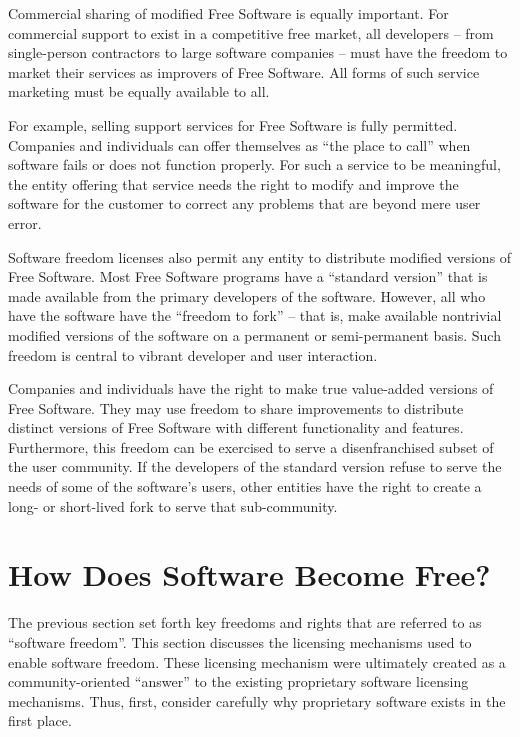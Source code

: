 Commercial sharing of modified Free Software is equally important.
For commercial support to exist in a competitive free market, all
developers -- from single-person contractors to large software
companies -- must have the freedom to market their services as
improvers of Free Software.  All forms of such service marketing must
be equally available to all.

For example, selling support services for Free Software is fully
permitted. Companies and individuals can offer themselves as ``the place
to call'' when software fails or does not function properly.  For such a
service to be meaningful, the entity offering that service needs the
right to modify and improve the software for the customer to correct any
problems that are beyond mere user error.

Software freedom licenses also permit any entity to distribute modified
versions of Free Software.  Most Free Software programs have a ``standard
version'' that is made available from the primary developers of the software.
However, all who have the software have the ``freedom to fork'' -- that is,
make available nontrivial modified versions of the software on a permanent or
semi-permanent basis.  Such freedom is central to vibrant developer and user
interaction.

Companies and individuals have the right to make true value-added versions
of Free Software.  They may use freedom to share improvements to
distribute distinct versions of Free Software with different functionality
and features.  Furthermore, this freedom can be exercised to serve a
disenfranchised subset of the user community.  If the developers of the
standard version refuse to serve the needs of some of the software's
users, other entities have the right to create a long- or short-lived fork
to serve that sub-community.

\section{How Does Software Become Free?}

The previous section set forth key freedoms and rights that are referred to
as ``software freedom''.  This section discusses the licensing mechanisms
used to enable software freedom.  These licensing mechanism were ultimately
created as a community-oriented ``answer'' to the existing proprietary
software licensing mechanisms.  Thus, first, consider carefully why
proprietary software exists in the first place.

